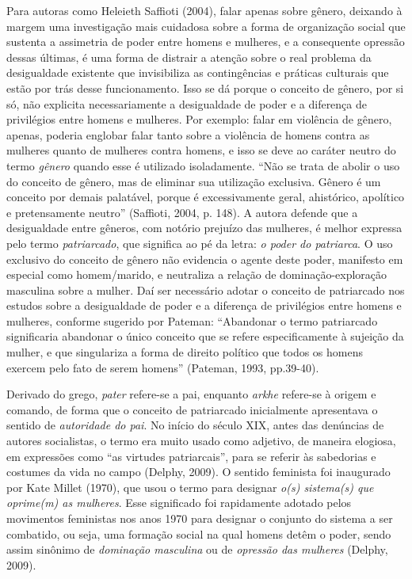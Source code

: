 Para autoras como Heleieth Saffioti (2004), falar apenas sobre gênero, deixando à margem uma investigação mais cuidadosa sobre a forma de organização social que sustenta a assimetria de poder entre homens e mulheres, e a consequente opressão dessas últimas, é uma forma de distrair a atenção sobre o real problema da desigualdade existente que invisibiliza as contingências e práticas culturais que estão por trás desse funcionamento. Isso se dá porque o conceito de gênero, por si só, não explicita necessariamente a desigualdade de poder e a diferença de privilégios entre homens e mulheres. Por exemplo: falar em violência de gênero, apenas, poderia englobar falar tanto sobre a violência de homens contra as mulheres quanto de mulheres contra homens, e isso se deve ao caráter neutro do termo \textit{gênero} quando esse é utilizado isoladamente. ``Não se trata de abolir o uso do conceito de gênero, mas de eliminar sua utilização exclusiva. Gênero é um conceito por demais palatável, porque é excessivamente geral, ahistórico, apolítico e pretensamente neutro'' (Saffioti, 2004, p. 148). A autora defende que a desigualdade entre gêneros, com notório prejuízo das mulheres, é melhor expressa pelo termo \textit{patriarcado}, que significa ao pé da letra: \textit{o poder do patriarca}. O uso exclusivo do conceito de gênero não evidencia o agente deste poder, manifesto em especial como homem/marido, e neutraliza a relação de dominação-exploração masculina sobre a mulher. Daí ser necessário adotar o conceito de patriarcado nos estudos sobre a desigualdade de poder e a diferença de privilégios entre homens e mulheres, conforme sugerido por Pateman: ``Abandonar o termo patriarcado significaria abandonar o único conceito que se refere especificamente à sujeição da mulher, e que singulariza a forma de direito político que todos os homens exercem pelo fato de serem homens'' (Pateman, 1993, pp.39-40).

Derivado do grego, \textit{pater} refere-se a pai, enquanto \textit{arkhe} refere-se à origem e comando, de forma que o conceito de patriarcado inicialmente apresentava o sentido de \textit{autoridade do pai}. No início do século XIX, antes das denúncias de autores socialistas, o termo era muito usado como adjetivo, de maneira elogiosa, em expressões como ``as virtudes patriarcais'', para se referir às sabedorias e costumes da vida no campo (Delphy, 2009). O sentido feminista foi inaugurado por Kate Millet (1970), que usou o termo para designar \textit{o(s) sistema(s) que oprime(m) as mulheres}. Esse significado foi rapidamente adotado pelos movimentos feministas nos anos 1970 para designar o conjunto do sistema a ser combatido, ou seja, uma formação social na qual homens detêm o poder, sendo assim sinônimo de \textit{dominação masculina} ou de \textit{opressão das mulheres} (Delphy, 2009).

